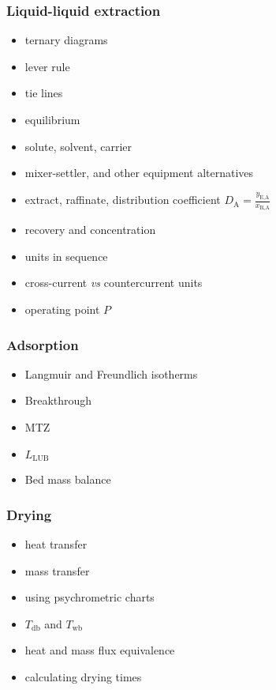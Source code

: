 {
\begin{frame}\frametitle{Liquid-liquid extraction {}}
	{}
	\begin{itemize}
		\item	ternary diagrams
		\item	lever rule
		\item	tie lines
		\item	equilibrium
		\item	solute, solvent, carrier
		\item	mixer-settler, and other equipment alternatives
		\item	extract, raffinate, distribution coefficient $D_\text{A} = \displaystyle \frac{y_\text{E,A}}{x_\text{R,A}}$
		\item	recovery and concentration
		\item	units in sequence
		\item	cross-current \emph{vs} countercurrent units
		\item	operating point $P$
	\end{itemize}
\end{frame}}

{
\begin{frame}\frametitle{Adsorption {}}
	\begin{itemize}
		\item	Langmuir and Freundlich isotherms
		\item	Breakthrough
		\item	MTZ
		\item	$L_\text{LUB}$
		\item	Bed mass balance
	\end{itemize}
\end{frame}}

{
\begin{frame}\frametitle{Drying {}}
	\begin{itemize}
		\item	heat transfer
		\item	mass transfer
		\item	using psychrometric charts
		\item	$T_\text{db}$ and $T_\text{wb}$
		\item	heat and mass flux equivalence
		\item	calculating drying times
	\end{itemize}
\end{frame}}

